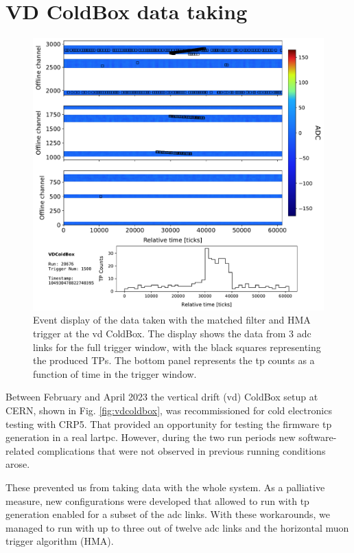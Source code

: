 \section{VD ColdBox data taking}
\label{sec:matched_filter_vdcoldbox}

\begin{figure}[t]
    \centering
    \includegraphics[scale = 0.5]{Images/Matched_Filter/TRDisplay_np02_coldbox_run020676_0001.pdf}
    \caption[Event display of the data taken with the matched filter and HMA trigger at the \gls{vd} ColdBox.]{Event display of the data taken with the matched filter and HMA trigger at the \gls{vd} ColdBox. The display shows the data from 3 \gls{adc} links for the full trigger window, with the black squares representing the produced TPs. The bottom panel represents the \gls{tp} counts as a function of time in the trigger window.}
    \label{fig:example_hma_evd}
\end{figure}

Between February and April 2023 the vertical drift (\gls{vd}) ColdBox setup at CERN, shown in Fig. \ref{fig:vdcoldbox}, was recommissioned for cold electronics testing with CRP5. That provided an opportunity for testing the firmware \gls{tp} generation in a real \gls{lartpc}. However, during the two run periods new software-related complications that were not observed in previous running conditions arose.

These prevented us from taking data with the whole system. As a palliative measure, new configurations were developed that allowed to run with \gls{tp} generation enabled for a subset of the \gls{adc} links. With these workarounds, we managed to run with up to three out of twelve \gls{adc} links and the horizontal muon trigger algorithm (HMA).

